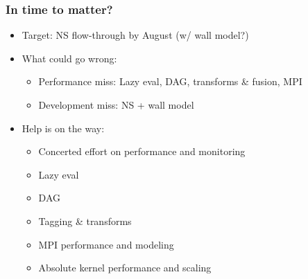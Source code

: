 


\begin{frame}\frametitle{In time to matter?}
\begin{itemize}
\item Target: NS flow-through by August (w/ wall model?)
\item What could go wrong:
\begin{itemize}
\item Performance miss: Lazy eval, DAG, transforms \& fusion, MPI
\item Development miss: NS + wall model
\end{itemize}
\item Help is on the way:
\begin{itemize}
\item Concerted effort on performance and monitoring 
\item Lazy eval 
\item DAG 
\item Tagging \& transforms  
\item MPI performance and modeling 
\item Absolute kernel performance and scaling 
\end{itemize}
\end{itemize}
\end{frame}

